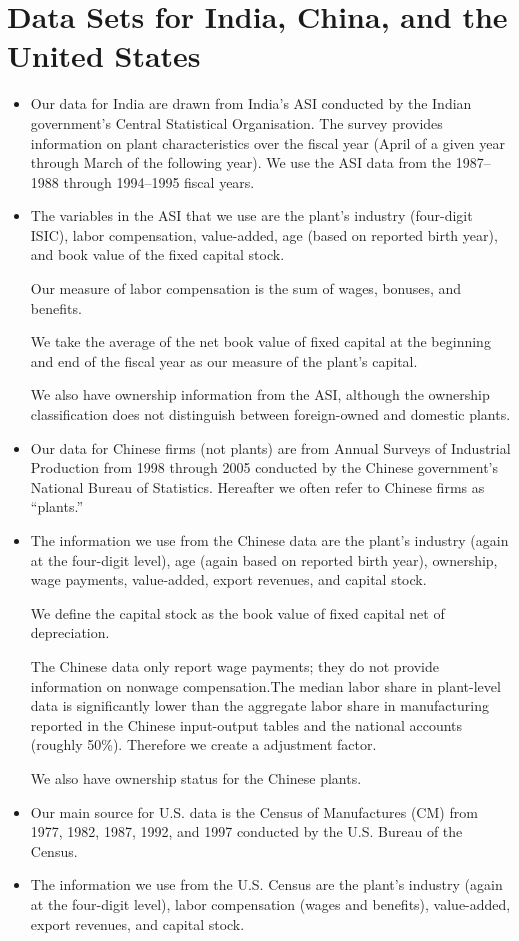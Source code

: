 \documentclass{article}
\begin{document}
\section*{Data Sets for India, China, and the United States}
    \begin{itemize}
    \item Our data for India are drawn from India’s ASI conducted by the Indian government’s Central Statistical Organisation. The survey provides information on plant characteristics over the fiscal year (April of a given year through March of the following year). We use the ASI data from the 1987–1988 through 1994–1995 fiscal years.
    \item The variables in the ASI that we use are the plant’s industry (four-digit ISIC), labor compensation, value-added, age (based on reported birth year), and book value of the fixed capital stock.
    
    Our measure of labor compensation is the sum of wages, bonuses, and benefits. 

    We take the average of the net book value of fixed capital at the beginning and end of the fiscal year as our measure of the plant’s capital.

    We also have ownership information from the ASI, although the ownership classification does not distinguish between foreign-owned and domestic plants.

    \item Our data for Chinese firms (not plants) are from Annual Surveys of Industrial Production from 1998 through 2005 conducted by the Chinese government’s National Bureau of Statistics. Hereafter
    we often refer to Chinese firms as “plants.”
    \item The information we use from the Chinese data are the plant’s industry (again at the four-digit level), age (again based on reported birth year), ownership, wage payments, value-added, export revenues, and capital stock. 
    
    We define the capital stock as the book value of fixed capital net of depreciation.

    The Chinese data only report wage payments; they do not provide information on nonwage compensation.The median labor share in plant-level data is significantly lower than the aggregate labor share in manufacturing reported in the Chinese input-output tables and the national accounts (roughly 50\%). Therefore we create a adjustment factor.

    We also have ownership status for the Chinese plants.
    \item Our main source for U.S. data is the Census of Manufactures (CM) from 1977, 1982, 1987, 1992, and 1997 conducted by the U.S. Bureau of the Census.
    \item The information we use from the U.S. Census are the plant’s industry (again at the four-digit level), labor compensation (wages and benefits), value-added, export revenues, and capital stock.
    

\end{itemize}
\end{document}
